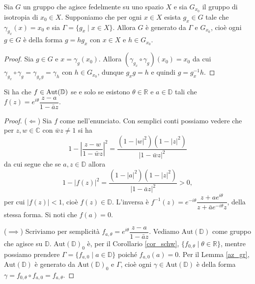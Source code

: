 \begin{lm} \label{az_gr}
  Sia $G$ un gruppo che agisce fedelmente su uno spazio $X$ e sia $G_{x_0}$ il gruppo di isotropia di $x_0 \in X$. Supponiamo che per ogni $x \in X$ esista $g_x \in G$ tale che $\gamma_{g_x}(x)=x_0$ e sia $\Gamma=\{g_x \mid x \in X\}$.
  Allora $G$ è generato da $\Gamma$ e $G_{x_0}$, cioè ogni $g \in G$ è della forma $g=hg_x$ con $x \in X$ e $h \in G_{x_0}$.
\end{lm}
\begin{proof}
  Sia $g \in G$ e $x=\gamma_g(x_0)$. Allora $(\gamma_{g_x}\circ \gamma_g)(x_0)=x_0$ da cui $\gamma_{g_x}\circ \gamma_g=\gamma_{g_xg}=\gamma_h$ con $h \in G_{x_0}$, dunque $g_xg=h$ e quindi $g=g_x^{-1}h$.
\end{proof}

\begin{prop} \label{aut}
  Si ha che $f \in \text{\normalfont{Aut}}(\mathbb{D})$ se e solo se esistono $\theta \in \mathbb{R}$ e $a \in \mathbb{D}$ tali che $f(z)=e^{i\theta}\dfrac{z-a}{1-\bar{a}z}$.
\end{prop}

\begin{proof}
  ($\Leftarrow$) Sia $f$ come nell'enunciato. Con semplici conti possiamo vedere che per $z,w \in \mathbb{C}$ con $\bar{w}z\not=1$ si ha
  \begin{equation} \label{formuletta}
    1-\left|\frac{z-w}{1-\bar{w}z}\right|^2=\frac{(1-|w|^2)(1-|z|^2)}{|1-\bar{w}z|^2}
  \end{equation}
  da cui segue che se $a, z \in \mathbb{D}$ allora
  $$1-|f(z)|^2=\frac{(1-|a|^2)(1-|z|^2)}{|1-\bar{a}z|^2}>0,$$
  per cui $|f(z)|<1$, cioè $f(z) \in \mathbb{D}$. L'inversa è $f^{-1}(z)=e^{-i\theta}\dfrac{z+ae^{i\theta}}{z+\bar{a}e^{-i\theta}z}$, della stessa forma. Si noti che $f(a)=0$.

  ($\implies$) Scriviamo per semplicità $f_{a, \theta}=e^{i\theta}\dfrac{z-a}{1-\bar{a}z}$. Vediamo $\text{Aut}(\mathbb{D})$ come gruppo che agisce su $\mathbb{D}$. $\text{Aut}(\mathbb{D})_0$ è, per il Corollario \ref{cor_schw}, $\{f_{0, \theta} \mid \theta \in \mathbb{R}\}$,
  mentre possiamo prendere $\Gamma=\{f_{a, 0} \mid a \in \mathbb{D}\}$ poiché $f_{a, 0}(a)=0$.
  Per il Lemma \ref{az_gr}, $\text{Aut}(\mathbb{D})$ è generato da $\text{Aut}(\mathbb{D})_0$ e $\Gamma$, cioè ogni $\gamma \in \text{Aut}(\mathbb{D})$ è della forma $\gamma=f_{0, \theta} \circ f_{a, 0}=f_{a, \theta}$.
\end{proof}

